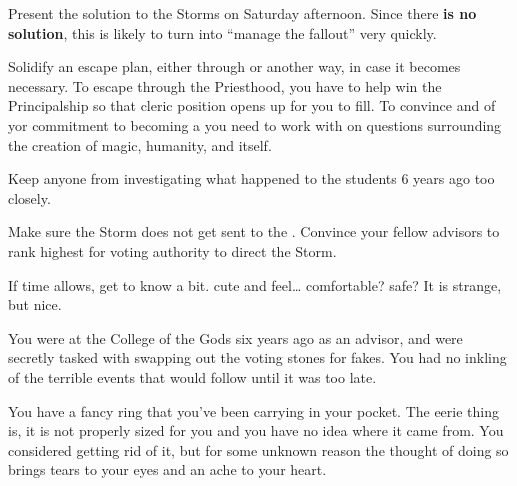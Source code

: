 \documentclass[char]{GL2020}
\begin{document}
\begin{itemz}
	\item Present the \pTech{} solution to the Storms on Saturday afternoon. Since there \textbf{is no solution}, this is likely to turn into ``manage the fallout'' very quickly.
	\item Solidify an escape plan, either through \cBeetle{} or another way, in case it becomes necessary. To escape through the Priesthood, you have to help \cBeetle{} win the Principalship so that \cBeetle{\their} cleric position opens up for you to fill. To convince \cBeetle{} and \cAntiChup{} of yor commitment to becoming a \cHeadScientist{\cleric} you need to work with \cEbbPriest{} on questions surrounding the creation of magic, humanity, and \pEarth{} itself.
	\item Keep anyone from investigating what happened to the students 6 years ago too closely.
	\item Make sure the Storm does not get sent to the \pTech{}. Convince your fellow \pTech{} advisors to rank \cTechStar{} highest for voting authority to direct the Storm.
	\item If time allows, get to know \cChupAvenger{} a bit. \cChupAvenger{\theyare} cute and feel\cChupAvenger{\plural}\ldots{} comfortable? safe? It is strange, but nice.
\end{itemz}

\begin{itemz}[Notes]
	\item You were at the College of the Gods six years ago as an advisor, and were secretly tasked with swapping out the voting stones for fakes. You had no inkling of the terrible events that would follow until it was too late.
	\item You have a fancy ring that you've been carrying in your pocket. The eerie thing is, it is not properly sized for you and you have no idea where it came from. You considered getting rid of it, but for some unknown reason the thought of doing so brings tears to your eyes and an ache to your heart. 
\end{itemz}
\end{document}
